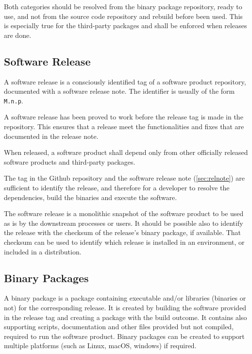 Both categories should be resolved from the binary package repository, ready to use, and not from the source code repository and rebuild before been used.
This is especially true for the third-party packages and shall be enforced when releases are done.


\subsection{Software Release} \label{sec:swrel}

A software release is a consciously identified tag of a software product repository, documented with a software release note.
The identifier is usually of the form \texttt{M.n.p}.

A software release has been proved to work before the release tag is made in the repository.
This ensures that a release meet the functionalities and fixes that are documented in the release note.

When released, a software product shall depend only from other officially released software products and third-party packages.

The tag in the Github repository and the software release note (\ref{sec:relnote}) are sufficient to identify the release, 
and therefore for a developer to resolve the dependencies, build the binaries and execute the software.

The software release is a monolithic snapshot of the software product to be used as is by the downstream processes or users.
It should be possible also to identify the release with the checksum of the release's binary package, if available.
That checksum can be used to identify which release is installed in an environment, or included in a distribution.


\subsection{Binary Packages} \label{sec:swbpkg}

A binary package is a package containing executable and/or libraries (binaries or not) for the corresponding release.
It is created by building the software provided in the release tag and creating a package with the build outcome. 
It contains also supporting scripts, documentation and other files provided but not compiled, required to run the software product.
Binary packages can be created to support multiple platforms (such as Linux, macOS, windows) if required.

